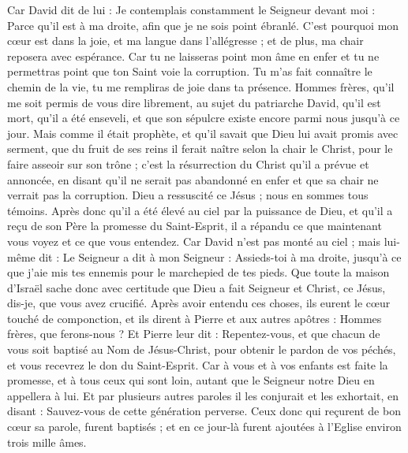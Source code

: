 \begin{multicols}{2}
{Car David dit de lui : Je contemplais constamment le Seigneur devant moi : Parce qu'il est à ma droite, afin que je ne sois point ébranlé.
C'est pourquoi mon cœur est dans la joie, et ma langue dans l'allégresse ; et de plus, ma chair reposera avec espérance.
Car tu ne laisseras point mon âme en enfer et tu ne permettras point que ton Saint voie la corruption.
Tu m'as fait connaître le chemin de la vie, tu me rempliras de joie dans ta présence.
Hommes frères, qu'il me soit permis de vous dire librement, au sujet du patriarche David, qu'il est mort, qu'il a été enseveli, et que son sépulcre existe encore parmi nous jusqu'à ce jour.
Mais comme il était prophète, et qu'il savait que Dieu lui avait promis avec serment, que du fruit de ses reins il ferait naître selon la chair le Christ, pour le faire asseoir sur son trône ;
c'est la résurrection du Christ qu'il a prévue et annoncée, en disant qu'il ne serait pas abandonné en enfer et que sa chair ne verrait pas la corruption.
Dieu a ressuscité ce Jésus ; nous en sommes tous témoins.
Après donc qu'il a été élevé au ciel  par la puissance de Dieu, et qu'il a reçu de son Père la promesse du Saint-Esprit, il a répandu ce que maintenant vous voyez et ce que vous entendez.
Car David n'est pas monté au ciel ; mais lui-même dit : Le Seigneur a dit à mon Seigneur : Assieds-toi à ma droite,
jusqu'à ce que j'aie mis tes ennemis pour le marchepied de tes pieds. 
Que toute la maison d'Israël sache donc avec certitude que Dieu a fait Seigneur et Christ, ce Jésus, dis-je, que vous avez crucifié.
Après avoir entendu ces choses, ils eurent le cœur touché de componction, et ils dirent à Pierre et aux autres apôtres : Hommes frères, que ferons-nous ?
Et Pierre leur dit : Repentez-vous, et que chacun de vous soit baptisé au Nom de Jésus-Christ, pour obtenir le pardon de vos péchés, et vous recevrez le don du Saint-Esprit.
Car à vous et à vos enfants est faite la promesse, et à tous ceux qui sont loin, autant que le Seigneur notre Dieu en appellera à lui.
Et par plusieurs autres paroles il les conjurait et les exhortait, en disant : Sauvez-vous de cette génération perverse.
Ceux donc qui reçurent de bon cœur sa parole, furent baptisés ; et en ce jour-là furent ajoutées à l'Eglise environ trois mille âmes.
}
\end{multicols}
